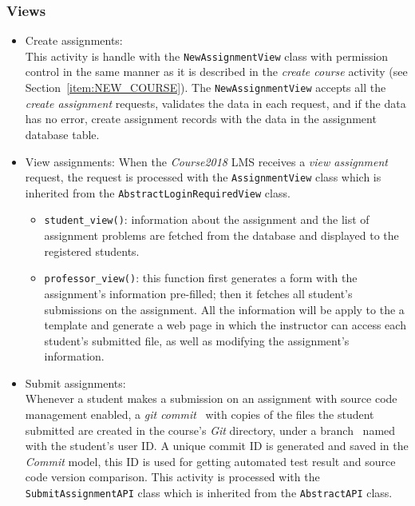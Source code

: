 \subsubsection{Views}
\begin{itemize}
    \item Create assignments: \\
        This activity is handle with the \texttt{NewAssignmentView} class with 
        permission control in the same manner as it is described in the
        \emph{create course} activity (see Section~\ref{item:NEW_COURSE}).
        The \texttt{NewAssignmentView} accepts all the \emph{create assignment}
        requests, validates the data in each request, and if the data has no
        error, create assignment records with the data in the assignment
        database table.

    \item View assignments:
        When the \emph{Course2018} LMS receives a \emph{view assignment}
        request, the request is processed with the \texttt{AssignmentView}
        class which is inherited from the \texttt{AbstractLoginRequiredView}
        class.
        \begin{itemize}
            \item \texttt{student\_view()}:
                information about the assignment and the list of assignment
                problems are fetched from the database and displayed to the 
                registered students.
            \item \texttt{professor\_view()}:
            \label{item:PROF_VIEW}
                this function first generates a form with the assignment's
                information pre-filled; then it fetches all student's
                submissions on the assignment. All the information will
                be apply to the a template and generate a web page in which
                the instructor can access each student's submitted file, as
                well as modifying the assignment's information.
        \end{itemize}

    \item Submit assignments: \\
        Whenever a student makes a submission on an assignment with source
        code management enabled, 
        a \emph{git commit}~\citep[Chapter 2]{progit} with copies of the files
        the student submitted are created in the course's \emph{Git} directory,
        under a branch~\cite[Chapter 3]{progit} named with the student's user
        ID.
        A unique commit ID is generated and saved in the \emph{Commit} model,
        this ID is used for getting automated test result and
        source code version comparison.
        This activity is processed with the \texttt{SubmitAssignmentAPI} class
        which is inherited from the \texttt{AbstractAPI} class.
\end{itemize}

